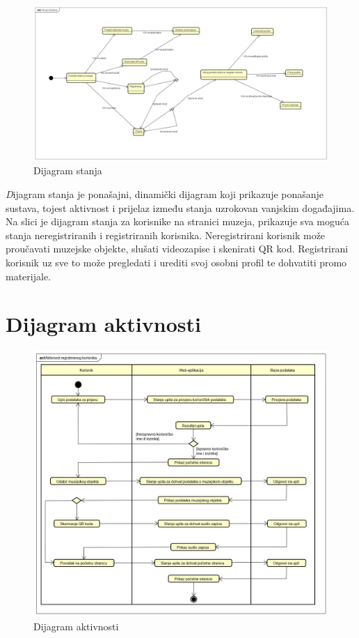 			\begin{figure}[H]
				\includegraphics[scale=0.32]{slike/Dijagramstanja.png}
				\centering
				\caption{Dijagram stanja}
				\label{fig:promjene}
			\end{figure}
		
		
		\textit Dijagram stanja je ponašajni, dinamički dijagram koji prikazuje ponašanje sustava, tojest aktivnost i prijelaz između stanja uzrokovan vanjskim događajima. Na slici je dijagram stanja za korisnike na stranici muzeja, prikazuje sva moguća stanja neregistriranih i registriranih korisnika. Neregistrirani korisnik može proučavati muzejske objekte, slušati videozapise i skenirati QR kod. Registrirani korisnik uz sve to može pregledati i urediti svoj osobni profil te dohvatiti promo materijale.
		
		
		\eject 
		
		\section{Dijagram aktivnosti}
		
    		\begin{figure}[H]
				\includegraphics[scale=0.5]{slike/dijagram_aktivnosti.png}
				\centering
				\caption{Dijagram aktivnosti}
				\label{fig:promjene}
			\end{figure}
		
